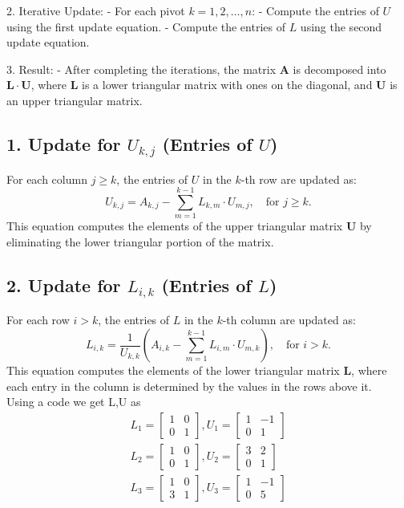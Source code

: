 \documentclass[journal]{IEEEtran}
\numberwithin{equation}{enumi}
\numberwithin{figure}{enumi}
\begin{document}
\begin{enumerate}
2. Iterative Update:
   - For each pivot $ k = 1, 2, \ldots, n $:
     - Compute the entries of $ U $ using the first update equation.
     - Compute the entries of $ L $ using the second update equation.
        
3. Result:
   - After completing the iterations, the matrix $ \mathbf{A} $ is decomposed into $ \mathbf{L} \cdot \mathbf{U} $, where $ \mathbf{L} $ is a lower triangular matrix with ones on the diagonal, and $ \mathbf{U} $ is an upper triangular matrix.

    

\subsection*{1. Update for $ U_{k,j} $ (Entries of $ U $)}

For each column $ j \geq k $, the entries of $ U $ in the $ k $-th row are updated as:
\[
U_{k,j} = A_{k,j} - \sum_{m=1}^{k-1} L_{k,m} \cdot U_{m,j}, \quad \text{for } j \geq k.
\]
This equation computes the elements of the upper triangular matrix $ \mathbf{U} $ by eliminating the lower triangular portion of the matrix.

\subsection*{2. Update for $ L_{i,k} $ (Entries of $ L $)}

For each row $ i > k $, the entries of $ L $ in the $ k $-th column are updated as:
\[
L_{i,k} = \frac{1}{U_{k,k}} \left( A_{i,k} - \sum_{m=1}^{k-1} L_{i,m} \cdot U_{m,k} \right), \quad \text{for } i > k.
\]
This equation computes the elements of the lower triangular matrix $ \mathbf{L} $, where each entry in the column is determined by the values in the rows above it.\\
Using a code we get L,U as 
\begin{align}   
L_1 = \begin{bmatrix} 1 & 0 \\ 0 & 1 \end{bmatrix},
U_1 = \begin{bmatrix} 1 & -1 \\ 0 & 1 \end{bmatrix}\\
L_2 = \begin{bmatrix} 1 & 0 \\ 0 & 1 \end{bmatrix},
U_2 = \begin{bmatrix} 3 & 2 \\ 0 & 1 \end{bmatrix}\\
L_3 = \begin{bmatrix} 1 & 0 \\ 3 & 1 \end{bmatrix},
U_3 = \begin{bmatrix} 1 & -1 \\ 0 & 5 \end{bmatrix}
\end{align}


\end{enumerate}
\end{document}
